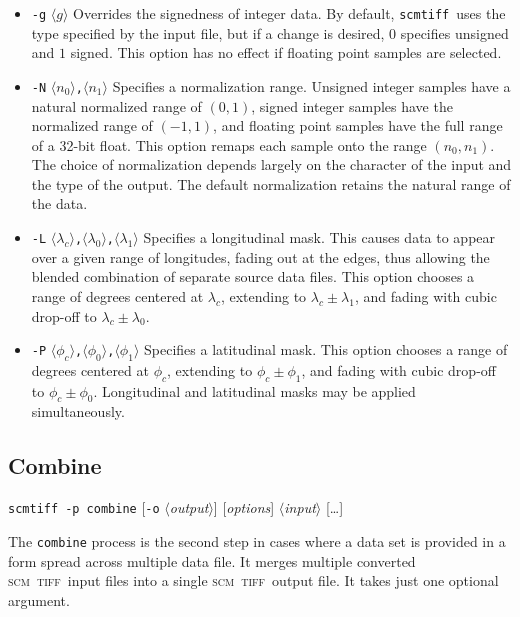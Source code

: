 \documentclass[oneside,10pt]{memoir}
\newcommand{\scm}     {\textsc{scm}}
\newcommand{\tiff}    {\textsc{tiff}}
\newcommand{\scmtiff} {\texttt{scmtiff}}
\newcommand{\inangles}[1]{$\langle$#1$\rangle$}
\newenvironment{optionlist}
  {\setlength{\leftmargini}{1in}\begin{itemize}}{\end{itemize}}
\begin{document}
\begin{Spacing}{1.1}
\begin{optionlist}
\item[\texttt{-g} \inangles{$g$}] Overrides the signedness of integer data. By default, \scmtiff\ uses the type specified by the input file, but if a change is desired, $0$ specifies unsigned and $1$ signed. This option has no effect if floating point samples are selected.

\item[\texttt{-N} \inangles{$n_0$}\texttt{,}\inangles{$n_1$}] Specifies a normalization range. Unsigned integer samples have a natural normalized range of $(0, 1)$, signed integer samples have the normalized range of $(-1,1)$, and floating point samples have the full range of a 32-bit float. This option remaps each sample onto the range $(n_0,n_1)$. The choice of normalization depends largely on the character of the input and the type of the output. The default normalization retains the natural range of the data.

\item[\texttt{-L} \inangles{$\lambda_c$}\texttt{,}\inangles{$\lambda_0$}\texttt{,}\inangles{$\lambda_1$}] Specifies a longitudinal mask. This causes data to appear over a given range of longitudes, fading out at the edges, thus allowing the blended combination of separate source data files. This option chooses a range of degrees centered at $\lambda_c$, extending to $\lambda_c\pm\lambda_1$, and fading with cubic drop-off to $\lambda_c\pm\lambda_0$.

\item[\texttt{-P} \inangles{$\phi_c$}\texttt{,}\inangles{$\phi_0$}\texttt{,}\inangles{$\phi_1$}] Specifies a latitudinal mask. This option chooses a range of degrees centered at $\phi_c$, extending to $\phi_c\pm\phi_1$, and fading with cubic drop-off to $\phi_c\pm\phi_0$. Longitudinal and latitudinal masks may be applied simultaneously.
\end{optionlist}

\subsection{Combine}

\noindent\scmtiff\ \texttt{-p combine} [\texttt{-o} \inangles{\textit{output}}] [\textit{options}] \inangles{\textit{input}} [\ldots]

\bigskip The \texttt{combine} process is the second step in cases where a data set is provided in a form spread across multiple data file. It merges multiple converted \scm\ \tiff\ input files into a single \scm\ \tiff\ output file. It takes just one optional argument.


\end{Spacing}
\end{document}
